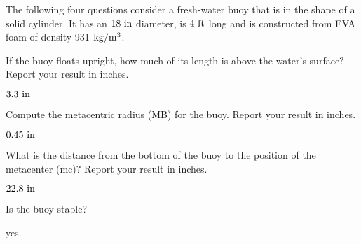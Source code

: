 \documentclass[multi,preview,varwidth=false,border=5,12pt]{standalone}
\begin{document}
\begin{question}

The following four questions consider a fresh-water buoy that is in the shape of a solid cylinder.  It has an $18~\mathrm{in}$ diameter, is $4~\mathrm{ft}$ long and is constructed from EVA foam of density 931 $\mathrm{kg}/\mathrm{m}^3$.

If the buoy floats upright, how much of its length is above the water's surface?
Report your result in inches.

\begin{solution}
    $3.3~\mathrm{in}$
\end{solution}

\end{question}

\begin{question}
Compute the metacentric radius (MB) for the buoy.  Report your result in inches.

\begin{solution}
    $0.45~\mathrm{in}$
\end{solution}

\end{question}

\begin{question}
What is the distance from the bottom of the buoy to the position of the metacenter (mc)?  Report your result in inches.

\begin{solution}
    $22.8~\mathrm{in}$
\end{solution}

\end{question}

\begin{question}
Is the buoy stable?

\begin{solution}
    yes.
\end{solution}

\end{question}
\end{document}
